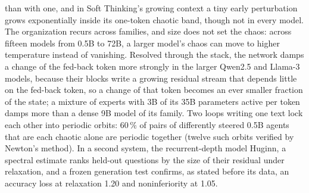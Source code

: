 \documentclass[11pt,letterpaper]{article}
\begin{document}
\begin{enumerate}
  than with one, and in Soft Thinking's growing context a tiny early perturbation grows exponentially inside its
  one-token chaotic band, though not in every model. The organization recurs across families, and size does not set
  the chaos: across fifteen models from 0.5B to 72B, a larger model's chaos can move to higher temperature instead of
  vanishing. Resolved through the stack, the network damps a change of the fed-back token more strongly in the larger
  Qwen2.5 and Llama-3 models, because their blocks write a growing residual stream that depends little on the
  fed-back token, so a change of that token becomes an ever smaller fraction of the state; a mixture of experts with
  3B of its 35B parameters active per token damps more than a dense 9B model of its family. Two loops writing one text lock each other into periodic orbits: 60\,\% of pairs of differently steered
  0.5B agents that are each chaotic alone are periodic together (twelve such orbits verified by Newton's method). In a
  second system, the recurrent-depth model Huginn, a spectral estimate ranks held-out questions by the size of their
  residual under relaxation, and a frozen generation test confirms, as stated before its data, an accuracy loss at
  relaxation 1.20 and noninferiority at 1.05.
\end{enumerate}
\end{document}

